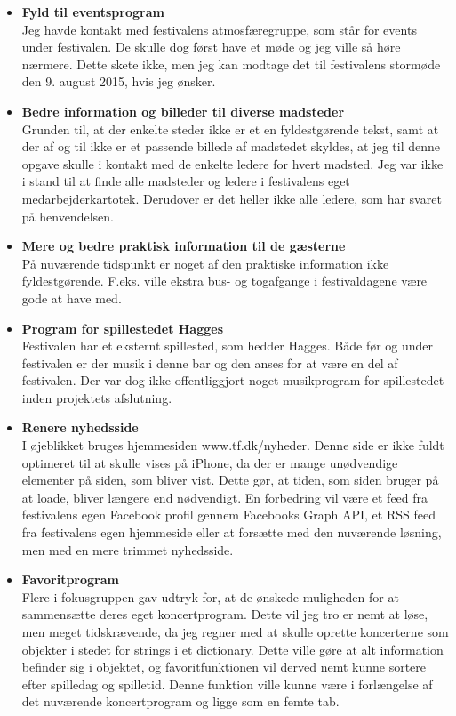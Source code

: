 \documentclass[a4paper,10pt,titlepage]{article}
\begin{document}
\begin{itemize}
\item
\textbf{Fyld til eventsprogram}\\
Jeg havde kontakt med festivalens atmosfæregruppe, som står for events under festivalen. De skulle dog først have et møde og jeg ville så høre nærmere. Dette skete ikke, men jeg kan modtage det til festivalens stormøde den 9. august 2015, hvis jeg ønsker.
\item
\textbf{Bedre information og billeder til diverse madsteder}\\
Grunden til, at der enkelte steder ikke er et en fyldestgørende tekst, samt at der af og til ikke er et passende billede af madstedet skyldes, at jeg til denne opgave skulle i kontakt med de enkelte ledere for hvert madsted. Jeg var ikke i stand til at finde alle madsteder og ledere i festivalens eget medarbejderkartotek. Derudover er det heller ikke alle ledere, som har svaret på henvendelsen. 
\item
\textbf{Mere og bedre praktisk information til de gæsterne}\\
På nuværende tidspunkt er noget af den praktiske information ikke fyldestgørende. F.eks. ville ekstra bus- og togafgange i festivaldagene være gode at have med.
\item
\textbf{Program for spillestedet Hagges}\\
Festivalen har et eksternt spillested, som hedder Hagges. Både før og under festivalen er der musik i denne bar og den anses for at være en del af festivalen. Der var dog ikke offentliggjort noget musikprogram for spillestedet inden projektets afslutning.
\item
\textbf{Renere nyhedsside}\\
I øjeblikket bruges hjemmesiden www.tf.dk/nyheder. Denne side er ikke fuldt optimeret til at skulle vises på iPhone, da der er mange unødvendige elementer på siden, som bliver vist. Dette gør, at tiden, som siden bruger på at loade, bliver længere end nødvendigt. En forbedring vil være et feed fra festivalens egen Facebook profil gennem Facebooks Graph API, et RSS feed fra festivalens egen hjemmeside eller at forsætte med den nuværende løsning, men med en mere trimmet nyhedsside.
\item
\textbf{Favoritprogram}\\
Flere i fokusgruppen gav udtryk for, at de ønskede muligheden for at sammensætte deres eget koncertprogram. Dette vil jeg tro er nemt at løse, men meget tidskrævende, da jeg regner med at skulle oprette koncerterne som objekter i stedet for strings i et dictionary. Dette ville gøre at alt information befinder sig i objektet, og favoritfunktionen vil derved nemt kunne sortere efter spilledag og spilletid. Denne funktion ville kunne være i forlængelse af det nuværende koncertprogram og ligge som en femte tab. 
\end{itemize}
\end{document}
